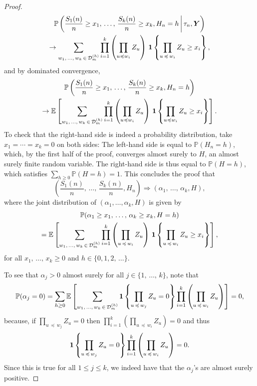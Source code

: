 \documentclass[AHL,Unicode,longabstracts,published]{cedram}
\newcommand{\bs}{\ensuremath{\boldsymbol}}
\newcommand{\sss}{\ensuremath{\scriptscriptstyle}}
\newcommand{\bbP}{\mathbb{P}}
\newcommand{\bbE}{\mathbb{E}}
\newcommand{\clD}{\mathcal{D}}
\begin{document}
\begin{proof}
\begin{multline*}
\bbP\left(\frac{S_1(n)}n\geq x_1,\,\ldots,\, \frac{S_k(n)}n\geq x_k, H_n = h \,\middle|\,\tau_n, \bs Y\right) \\
\to \sum_{w_1,\,\ldots,\,w_k\,\in\,\clD_m^{\sss (h)}}
\prod_{i=1}^k \left(\prod_{u\preccurlyeq w_i} Z_u\right)\,\bs 1\left\{\prod_{u\,\preccurlyeq\,w_i} Z_u\geq x_i \right\},
\end{multline*}
and by dominated convergence,
\begin{multline*}
\bbP\left(\frac{S_1(n)}n\geq x_1,\,\ldots,\,\frac{S_k(n)}n\geq x_k, H_n = h\right) \\
\to \bbE\left[\sum_{w_1,\,\ldots,\,w_k\,\in\,\clD_m^{\sss (h)}}
\prod_{i=1}^k \left(\prod_{u\preccurlyeq w_i} Z_u\right)\,\bs 1\left\{\prod_{u\preccurlyeq w_i} Z_u\geq x_i \right\}\right].
\end{multline*}
To check that the right-hand side is indeed a probability distribution, take $x_1=\cdots = x_k = 0$ on both sides: The left-hand side is equal to $\bbP(H_n = h)$, which, by the first half of the proof, converges almost surely to $H$, an almost surely finite random variable. The right-hand side is thus equal to $\bbP(H = h)$, which satisfies $\sum_{h\geq 0} \bbP(H = h) = 1$. This concludes the proof that
\[
\left(\frac{S_1(n)}n, \,\ldots,\, \frac{S_k(n)}n, H_n\right)
\Rightarrow (\alpha_1,\, \ldots,\, \alpha_k, H),
\]
where the joint distribution of $(\alpha_1, \ldots, \alpha_k, H)$ is given by
\begin{multline*}
\bbP(\alpha_1\geq x_1, \,\ldots,\, \alpha_k\geq x_k, H = h) \\
=\bbE\left[\sum_{w_1, \,\ldots,\, w_k\,\in\,\clD_m^{\sss (h)}}
\prod_{i=1}^k \left(\prod_{u\,\preccurlyeq\,w_i} Z_u\right)\,\bs 1\left\{\prod_{u\,\preccurlyeq\,w_i} Z_u\geq x_i \right\}\right],
\end{multline*}
for all $x_1, \,\ldots,\, x_k\geq 0$ and $h\in\{0, 1, 2,\, \ldots\}$.

To see that $\alpha_j>0$ almost surely for all $j\in\{1, \,\ldots,\, k\}$, note that
\[
\bbP(\alpha_j=0) =\sum_{h\geq 0} \bbE\left[\sum_{w_1, \,\ldots,\, w_k\,\in\,\clD_m^{\sss (h)}}
\bs 1\left\{\prod_{u\,\preccurlyeq\,w_j} Z_u=0\right\}
\prod_{i=1}^k \left(\prod_{u\,\preccurlyeq\,w_i} Z_u\right)\right] =0,
\]
because, if $\prod_{u\,\preccurlyeq\,w_j} Z_u=0$ then $\prod_{i=1}^k (\prod_{u\,\preccurlyeq\,w_i} Z_u)=0$ and thus
\[
\bs 1\left\{\prod_{u\,\preccurlyeq\,w_j} Z_u=0\right\}
\prod_{i=1}^k \left(\prod_{u\,\preccurlyeq\,w_i} Z_u\right)=0.
\]
Since this is true for all $1\leq j\leq k$, we indeed have that the $\alpha_j$'s are almost surely positive.
\end{proof}
\end{document}
